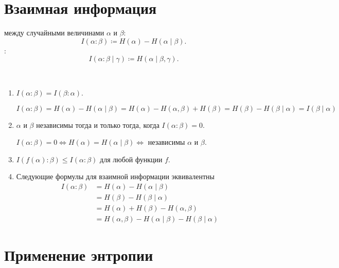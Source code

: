 \section{Взаимная информация}
\begin{defn}
	 между случайными величинами $  \alpha $ и $ \beta $:
	\[
		I( \alpha  \colon \beta ) \coloneqq H( \alpha ) - H( \alpha \mid \beta )
	.\] 
	:
		\[
			I ( \alpha \colon \beta \mid \gamma ) \coloneqq H( \alpha  \mid \beta , \gamma )
		.\] 
\end{defn}
\begin{prop}
	~\begin{enumerate}
		\item $ I( \alpha \colon \beta ) = I( \beta \colon \alpha )$.
			\begin{proof*}
				$ I( \alpha \colon \beta ) = H( \alpha ) - H( \alpha \mid \beta ) = H( \alpha ) - H( \alpha , \beta ) + H( \beta ) = H( \beta ) - H( \beta \mid \alpha ) = I( \beta \mid \alpha )$
			\end{proof*}

		\item $  \alpha $ и $  \beta $ независимы тогда и только тогда, когда $ I( \alpha \colon \beta ) = 0$.
			\begin{proof*}
				$ I( \alpha \colon \beta ) = 0 \Longleftrightarrow H( \alpha ) = H( \alpha \mid \beta ) \Longleftrightarrow $ независимы $  \alpha $ и $ \beta $.
			\end{proof*}
		\item $ I( f( \alpha ) \colon \beta ) \le I ( \alpha \colon \beta )$ для любой функции $ f$.
		\item  Следующие формулы для взаимной информации эквивалентны
			\begin{align*}
				I( \alpha \colon \beta ) &= H( \alpha) - H( \alpha  \mid \beta  ) \\
										 &= H( \beta ) - H( \beta \mid \alpha ) \\
										 &= H\left( \alpha  \right) + H( \beta ) - H( \alpha , \beta ) \\
										 &= H( \alpha , \beta ) - H( \alpha \mid \beta ) - H( \beta \mid \alpha )
			\end{align*}
	\end{enumerate}
\end{prop}

\section{Применение энтропии}
